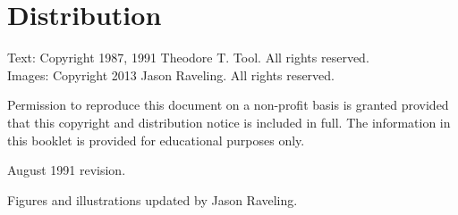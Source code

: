 \section*{Distribution}
Text: Copyright 1987, 1991 Theodore T. Tool. All rights reserved.\\
Images: Copyright 2013 Jason Raveling. All rights reserved.

Permission to reproduce this document on a non-profit basis is granted provided that this copyright and distribution notice is included in full.
The information in this booklet is provided for educational purposes only.

August 1991 revision.

Figures and illustrations updated by Jason Raveling.
